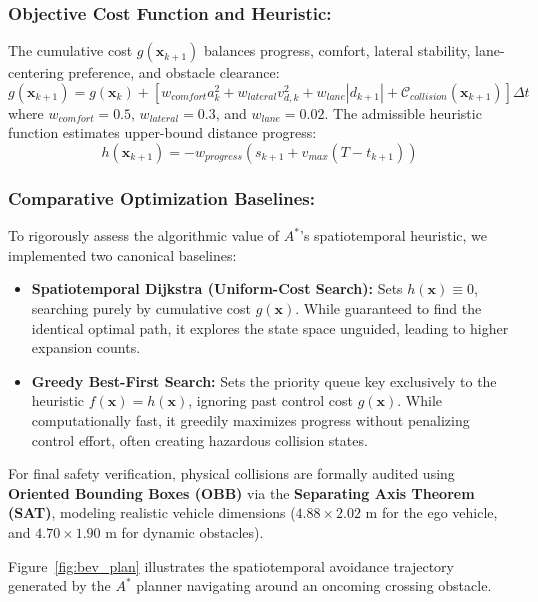 \documentclass[runningheads]{llncs}
\begin{document}
\subsubsection{Objective Cost Function and Heuristic:}
The cumulative cost $g(\mathbf{x}_{k+1})$ balances progress, comfort, lateral stability, lane-centering preference, and obstacle clearance:
\begin{equation}
g(\mathbf{x}_{k+1}) = g(\mathbf{x}_k) + \left[ w_{comfort} a_k^2 + w_{lateral} v_{d,k}^2 + w_{lane} |d_{k+1}| + \mathcal{C}_{collision}(\mathbf{x}_{k+1}) \right] \Delta t
\end{equation}
where $w_{comfort} = 0.5$, $w_{lateral} = 0.3$, and $w_{lane} = 0.02$. The admissible heuristic function estimates upper-bound distance progress:
\begin{equation}
h(\mathbf{x}_{k+1}) = -w_{progress} \left( s_{k+1} + v_{max}(T - t_{k+1}) \right)
\end{equation}

\subsubsection{Comparative Optimization Baselines:}
To rigorously assess the algorithmic value of $A^*$'s spatiotemporal heuristic, we implemented two canonical baselines:
\begin{itemize}
    \item \textbf{Spatiotemporal Dijkstra (Uniform-Cost Search):} Sets $h(\mathbf{x}) \equiv 0$, searching purely by cumulative cost $g(\mathbf{x})$. While guaranteed to find the identical optimal path, it explores the state space unguided, leading to higher expansion counts.
    \item \textbf{Greedy Best-First Search:} Sets the priority queue key exclusively to the heuristic $f(\mathbf{x}) = h(\mathbf{x})$, ignoring past control cost $g(\mathbf{x})$. While computationally fast, it greedily maximizes progress without penalizing control effort, often creating hazardous collision states.
\end{itemize}

For final safety verification, physical collisions are formally audited using \textbf{Oriented Bounding Boxes (OBB)} via the \textbf{Separating Axis Theorem (SAT)}, modeling realistic vehicle dimensions ($4.88 \times 2.02\text{ m}$ for the ego vehicle, and $4.70 \times 1.90\text{ m}$ for dynamic obstacles).

Figure~\ref{fig:bev_plan} illustrates the spatiotemporal avoidance trajectory generated by the $A^*$ planner navigating around an oncoming crossing obstacle.
\end{document}
